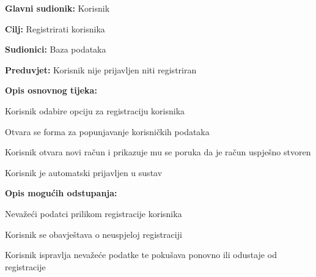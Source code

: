 \noindent {}
\begin{packed_item}

	\item \textbf{Glavni sudionik:} Korisnik
	\item \textbf{Cilj:} Registrirati korisnika
	\item \textbf{Sudionici:} Baza podataka
	\item \textbf{Preduvjet:} Korisnik nije prijavljen niti registriran
	\item \textbf{Opis osnovnog tijeka:}
	
	\item[] \begin{packed_enum}
		
		\item Korisnik odabire opciju za registraciju korisnika
		\item Otvara se forma za popunjavanje korisničkih podataka
		\item Korisnik otvara novi račun i prikazuje mu se poruka da je račun uspješno stvoren
		\item Korisnik je automatski prijavljen u sustav

	\end{packed_enum}

	\item  \textbf{Opis mogućih odstupanja:}
	
	\item[] \begin{packed_item}
	
		\item[3.a] Nevažeći podatci prilikom registracije korisnika
		\item[] \begin{packed_enum}
			
			\item Korisnik se obavještava o neuspjeloj registraciji
			\item Korisnik ispravlja nevažeće podatke te pokušava ponovno ili odustaje od registracije
			
		\end{packed_enum}
		
	\end{packed_item}
\end{packed_item}

